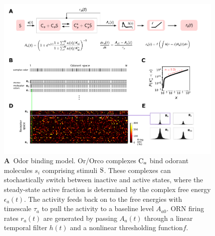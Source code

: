 \documentclass[9pt,twocolumn,twoside,lineno]{pnas-new}
\begin{document}
\begin{figure}[!tb]
	\centering
	\begin{subfigure}[t]{\linewidth}
		\label{fig:tuning_curves_a}
	\end{subfigure}
	\begin{subfigure}[t]{0\linewidth}
		\label{fig:tuning_curves_b}
	\end{subfigure}
	\begin{subfigure}[t]{0\linewidth}
		\label{fig:tuning_curves_c}
	\end{subfigure}
	\begin{subfigure}[t]{0\linewidth}
		\label{fig:tuning_curves_d}
	\end{subfigure}
	\begin{subfigure}[t]{0\linewidth}
		\label{fig:tuning_curves_e}
	\end{subfigure}
	\begin{subfigure}[t]{0\linewidth}
		\label{fig:tuning_curves_f}
	\end{subfigure}
	\includegraphics[width=\textwidth]{figures/1_tuning_curves}
	\caption{\footnotesize{
			\textbf{A}~Odor binding model. Or/Orco complexes $\textup{C}_a$ bind odorant molecules $s_i$ comprising stimuli $\textup{S}$. These complexes can stochastically switch between inactive and active states, where the steady-state active fraction is determined by the complex free energy $\epsilon_a(t)$. The activity feeds back on to the free energies with timescale $\tau_a$ to pull the activity to a baseline level $A_{a0}$. ORN firing rates $r_a(t)$ are generated by passing $A_a(t)$ through a linear temporal filter $h(t)$ and a nonlinear thresholding function$f$. 
}}
\end{figure}
\end{document}
